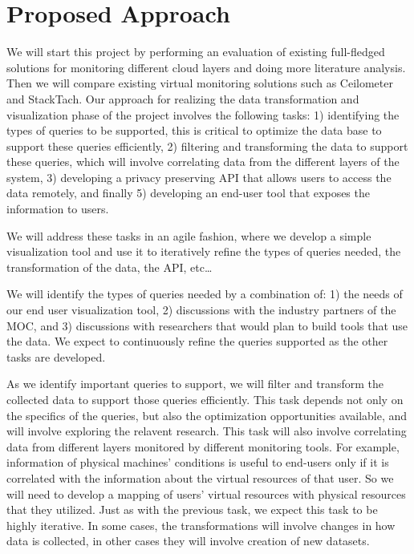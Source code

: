\section{Proposed Approach}
\label{sec:ProposedApproach}

%

We will start this project by performing an evaluation of existing full-fledged solutions for monitoring different cloud layers and doing more literature analysis. Then we will compare existing virtual monitoring solutions such as Ceilometer and StackTach. 
Our approach for realizing the data transformation and visualization phase of the project involves the following tasks: 1) identifying the types of queries to be supported, this is critical to optimize the data base to support these queries efficiently, 2) filtering and transforming the data to support these queries, which will involve correlating data from the different layers of the system, 3) developing a privacy preserving API that allows users to access the data remotely, and finally 5) developing an end-user tool that exposes the information to users.  

We will address these tasks in an agile fashion, where we develop a simple visualization tool and use it to iteratively refine the types of queries needed, the transformation of the data, the API, etc…  

We will identify the types of queries needed by a combination of: 1) the needs of our end user visualization tool, 2) discussions with the industry partners of the MOC, and 3) discussions with researchers that would plan to build tools that use the data.  We expect to continuously refine the queries supported as the other tasks are developed. 

As we identify important queries to support, we will  filter and transform the collected data to support those queries efficiently.  This task depends not only on the specifics of the queries, but also the optimization opportunities available, and will involve exploring the relavent research.   This task will also involve correlating data from different layers monitored by different monitoring tools. For example, information of physical machines’ conditions is useful to end-users only if it is correlated with the information about the virtual resources of that user. So we will need to develop a mapping of users’ virtual resources with physical resources that they utilized.  Just as with the previous task, we expect this task to be highly iterative.  In some cases, the transformations will involve changes in how data is collected, in other cases they will involve creation of new datasets. 


